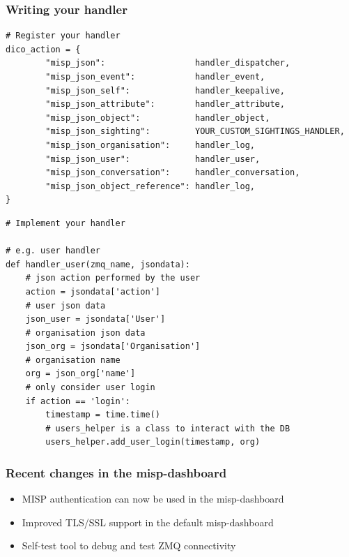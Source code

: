 \lstset{style=code,language=python}
\begin{frame}[fragile]
    \frametitle{Writing your handler}
    \begin{lstlisting}
# Register your handler
dico_action = {
        "misp_json":                  handler_dispatcher,
        "misp_json_event":            handler_event,
        "misp_json_self":             handler_keepalive,
        "misp_json_attribute":        handler_attribute,
        "misp_json_object":           handler_object,
        "misp_json_sighting":         YOUR_CUSTOM_SIGHTINGS_HANDLER,
        "misp_json_organisation":     handler_log,
        "misp_json_user":             handler_user,
        "misp_json_conversation":     handler_conversation,
        "misp_json_object_reference": handler_log,
}
    \end{lstlisting}
\end{frame}

\begin{frame}[fragile]
    \begin{lstlisting}
# Implement your handler

# e.g. user handler
def handler_user(zmq_name, jsondata):
    # json action performed by the user
    action = jsondata['action']
    # user json data
    json_user = jsondata['User']
    # organisation json data
    json_org = jsondata['Organisation']
    # organisation name
    org = json_org['name']
    # only consider user login
    if action == 'login':
        timestamp = time.time()
        # users_helper is a class to interact with the DB
        users_helper.add_user_login(timestamp, org)
    \end{lstlisting}
\end{frame}

\begin{frame}
        \frametitle{Recent changes in the misp-dashboard}
        \begin{itemize}
                \item MISP authentication can now be used in the misp-dashboard
                \item Improved TLS/SSL support in the default misp-dashboard
                \item Self-test tool to debug and test ZMQ connectivity
        \end{itemize}
\end{frame}

